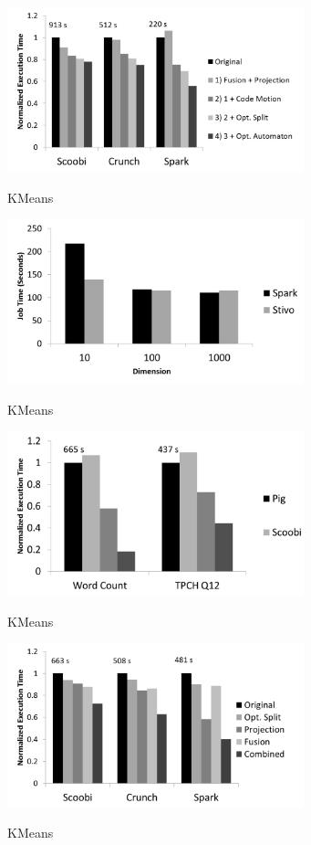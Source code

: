 \begin{figure}[!hbt]
    \includegraphics[width=8.6cm]{figures/word-count}
    \label{fig:word-count}\\%
   \caption{KMeans}
\end{figure}

\begin{figure}[!hbt]
    \includegraphics[width=8.6cm]{figures/k-means}
    \label{fig:k-means}\\%
   \caption{KMeans}
\end{figure}

\begin{figure}[!hbt]
    \includegraphics[width=8.6cm]{figures/pig}
    \label{fig:pig}\\%
   \caption{KMeans}
\end{figure}

\begin{figure}[!hbt]
    \includegraphics[width=8.6cm]{figures/tpch}
    \label{fig:tpch}\\%
   \caption{KMeans}
\end{figure}

